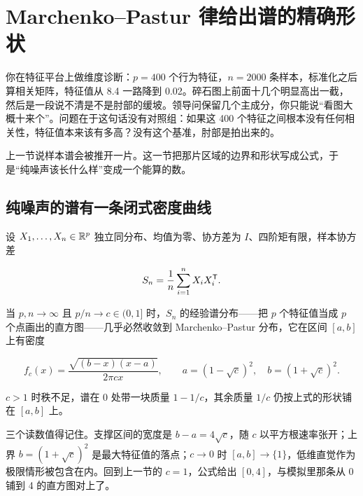 \section{Marchenko--Pastur 律给出谱的精确形状}
\label{sec:11-Mathematical-Statistics/09-Random-Matrix-Theory/02}

你在特征平台上做维度诊断：\(p=400\) 个行为特征，\(n=2000\) 条样本，标准化之后算相关矩阵，特征值从 8.4 一路降到 0.02。碎石图上前面十几个明显高出一截，然后是一段说不清是不是肘部的缓坡。领导问保留几个主成分，你只能说``看图大概十来个''。问题在于这句话没有对照组：如果这 400 个特征之间根本没有任何相关性，特征值本来该有多高？没有这个基准，肘部是拍出来的。

上一节说样本谱会被推开一片。这一节把那片区域的边界和形状写成公式，于是``纯噪声该长什么样''变成一个能算的数。

\subsection{纯噪声的谱有一条闭式密度曲线}

设 \(X_1,\ldots,X_n\in\mathbb{R}^p\) 独立同分布、均值为零、协方差为 \(I\)、四阶矩有限，样本协方差

\[
S_n=\frac1n\sum_{i=1}^n X_iX_i^{\mathsf{T}}.
\]

当 \(p,n\to\infty\) 且 \(p/n\to c\in(0,1]\) 时，\(S_n\) 的经验谱分布——把 \(p\) 个特征值当成 \(p\) 个点画出的直方图——几乎必然收敛到 Marchenko--Pastur 分布，它在区间 \([a,b]\) 上有密度

\[
f_c(x)=\frac{\sqrt{(b-x)(x-a)}}{2\pi cx},
\qquad a=(1-\sqrt c)^2,\quad b=(1+\sqrt c)^2 .
\]

\(c>1\) 时秩不足，谱在 0 处带一块质量 \(1-1/c\)，其余质量 \(1/c\) 仍按上式的形状铺在 \([a,b]\) 上。

三个读数值得记住。支撑区间的宽度是 \(b-a=4\sqrt c\)，随 \(c\) 以平方根速率张开；上界 \(b=(1+\sqrt c)^2\) 是最大特征值的落点；\(c\to0\) 时 \([a,b]\to\{1\}\)，低维直觉作为极限情形被包含在内。回到上一节的 \(c=1\)，公式给出 \([0,4]\)，与模拟里那条从 0 铺到 4 的直方图对上了。

